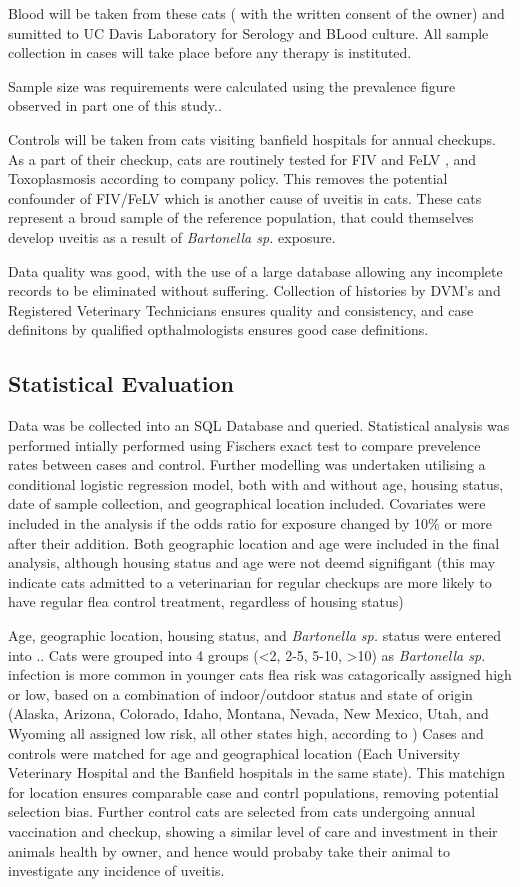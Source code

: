 \documentclass[11pt,twocolumn]{article}
\begin{document}
	Blood will be taken from these cats ( with the written consent of the owner) and sumitted to UC Davis Laboratory for Serology and BLood culture.
	All sample collection in cases will take place before any therapy is instituted.

	Sample size was requirements were calculated using the prevalence figure observed in part one of this study..

	Controls will be taken from cats visiting banfield hospitals for annual checkups. As a part of their checkup, cats are routinely tested for FIV and FeLV , and Toxoplasmosis according to company policy. This removes the potential confounder of FIV/FeLV which is another cause of uveitis in cats. These cats represent a broud sample of the reference population, that could themselves develop uveitis as a result of \emph{Bartonella sp.} exposure.

	Data quality was good, with the use of a large database allowing any incomplete records to be eliminated without suffering.
	Collection of histories by DVM's and Registered Veterinary Technicians ensures quality and consistency, and case definitons by qualified opthalmologists ensures good case definitions.

	\subsection{Statistical Evaluation}
		Data was be collected into an SQL Database and queried. Statistical analysis was performed intially performed using Fischers exact test to compare prevelence rates between cases and control. 
		Further modelling was undertaken utilising a conditional logistic regression model, both with and without age, housing status, date of sample collection, and geographical location included. 
		Covariates were included in the analysis if the odds ratio for exposure changed by 10\% or more after their addition.
		Both geographic location and age were included in the final analysis, although housing status and age were not deemd signifigant (this may indicate cats admitted to a veterinarian for regular checkups are more likely to have regular flea control treatment, regardless of housing status)

		Age, geographic location, housing status, and \emph{Bartonella sp.} status were entered into ..
		Cats were grouped into 4 groups (<2, 2-5, 5-10, >10) as \emph{Bartonella sp.} infection is more common in younger cats
		flea risk was catagorically assigned high or low, based on a combination of indoor/outdoor status and state of origin (Alaska, Arizona, Colorado, Idaho, Montana, Nevada, New Mexico, Utah, and Wyoming all assigned low risk, all other states high, according to \cite{Jameson1995a})
		Cases and controls were matched for age and geographical location (Each University Veterinary Hospital and the Banfield hospitals in the same state).
		This matchign for location ensures comparable case and contrl populations, removing potential selection bias. Further control cats are selected from cats undergoing annual vaccination and checkup, showing a similar level of care and investment in their animals health by owner, and hence would probaby take their animal to investigate any incidence of uveitis. %
\end{document}
